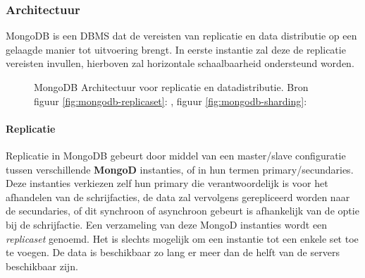 \subsubsection{Architectuur}
MongoDB is een DBMS dat de vereisten van replicatie en data distributie op een gelaagde manier tot uitvoering brengt. In eerste instantie zal deze de replicatie vereisten invullen, hierboven zal horizontale schaalbaarheid ondersteund worden. 

\begin{figure}[h!] 
\centering
	\hfill
	\caption{MongoDB Architectuur voor replicatie en datadistributie. Bron figuur \ref{fig:mongodb-replicaset}: \cite{mongodb-replicaset}, figuur \ref{fig:mongodb-sharding}: \cite{mongodb-shard}}
	\label{fig:mongodb-architectuur}
\end{figure}

\paragraph{Replicatie\cite{mongodb-replicaset}} Replicatie in MongoDB gebeurt door middel van een master/slave configuratie tussen verschillende \textbf{MongoD} instanties, of in hun termen primary/secundaries. Deze instanties verkiezen zelf hun primary die verantwoordelijk is voor het afhandelen van de schrijfacties, de data zal vervolgens gerepliceerd worden naar de secundaries, of dit synchroon of asynchroon gebeurt is afhankelijk van de optie bij de schrijfactie. Een verzameling van deze MongoD instanties wordt een \textit{replicaset} genoemd. Het is slechts mogelijk om een instantie tot een enkele set toe te voegen. De data is beschikbaar zo lang er meer dan de helft van de servers beschikbaar zijn. 

